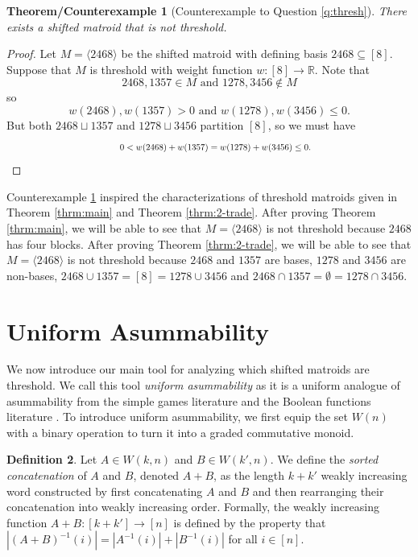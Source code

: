 \documentclass{amsart}
\theoremstyle{definition}
\newtheorem{defn}{Definition}[section]
\theoremstyle{plain}
\newtheorem{exthrm}[defn]{Theorem/Counterexample}
\newcommand{\R}{\mathbb{R}}
\begin{document}
\begin{exthrm}[Counterexample to Question \ref{q:thresh}]
\label{ex:counter}
  There exists a shifted matroid that is not threshold.
\end{exthrm}
\begin{proof}
Let $M=\langle 2468\rangle$ be the shifted matroid with defining basis $2468\subseteq [8]$. Suppose that $M$ is threshold with weight function $w:[8]\to \R$. Note that 
\[2468,1357 \in M \text{ and } 1278,3456 \not\in M \]
so
\[w(2468),w(1357) > 0 \text{ and } w(1278), w(3456) \leq 0. \]
But both $2468\sqcup 1357$ and $1278 \sqcup 3456$ partition $[8]$, so we must have 
\[\hspace{4.5cm}0< w(2468) + w(1357) = w(1278)+w(3456) \leq 0. \hspace{4cm}\]
\end{proof}

Counterexample \ref{ex:counter} inspired the characterizations of threshold matroids given in Theorem \ref{thrm:main} and Theorem \ref{thrm:2-trade}. After proving Theorem \ref{thrm:main}, we will be able to see that $M=\langle 2468 \rangle$ is not threshold because $2468$ has four blocks. After proving Theorem \ref{thrm:2-trade}, we will be able to see that $M=\langle 2468 \rangle$ is not threshold because $2468$ and $1357$ are bases, $1278$ and $3456$ are non-bases, $2468\cup 1357= [8]=1278 \cup 3456$ and $2468\cap 1357 = \emptyset = 1278\cap 3456$.

\section{Uniform Asummability}
\label{sec:trade}

We now introduce our main tool for analyzing which shifted matroids are threshold. We call this tool \emph{uniform asummability} as it is a uniform analogue of asummability from the simple games literature \cite[Section $2.6$]{TZ} and the Boolean functions literature \cite[Chapter $9$]{Boolean}. To introduce uniform asummability, we first equip the set $W(n)$ with a binary operation to turn it into a graded commutative monoid. 

\begin{defn}
  \label{defn:sorted}
  Let $A\in W(k,n)$ and $B\in W(k',n)$. We define the \emph{sorted concatenation} of $A$ and $B$, denoted $A+B$, as the length $k+k'$ weakly increasing word constructed by first concatenating $A$ and $B$ and then rearranging their concatenation into weakly increasing order. Formally, the weakly increasing function $A+B:[k+k']\to [n]$ is defined by the property that $|(A+B)^{-1}(i)|=|A^{-1}(i)|+|B^{-1}(i)|$ for all $i\in [n]$.
\end{defn}
\end{document}

